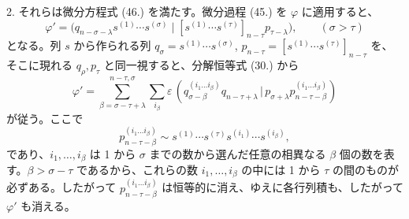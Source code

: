\documentclass[11pt]{jlreq}
\newcommand{\pair}[2]{(#1\,|\,#2)}
\newcommand{\eps}{\varepsilon}
\begin{document}
2. それらは微分方程式 (46.) を満たす。微分過程 (45.) を $\varphi$ に適用すると、
\[
 \varphi'=\bigl(q_{n-\sigma-\lambda}s^{(1)}\cdots s^{(\sigma)}\mid [s^{(1)}\cdots s^{(\tau)}]_{n-\tau}p_{\tau-\lambda}\bigr),\qquad (\sigma>\tau)
\]
となる。列 $s$ から作られる列 $q_\sigma=s^{(1)}\cdots s^{(\sigma)}$, $p_{n-\tau}=[s^{(1)}\cdots s^{(\tau)}]_{n-\tau}$ を、そこに現れる $q_\rho,p_\tau$ と同一視すると、分解恒等式 (30.) から
\[
 \varphi'=\sum_{\beta=\sigma-\tau+\lambda}^{n-\tau,\sigma}\sum_{i_\beta}\eps\,
 \pair{q_{\sigma-\beta}^{(i_1\ldots i_\beta)}q_{n-\tau+\lambda}}{p_{\sigma+\lambda}p_{n-\tau-\beta}^{(i_1\ldots i_\beta)}}
\]
が従う。ここで
\[
 p_{n-\tau-\beta}^{(i_1\ldots i_\beta)}\sim s^{(1)}\cdots s^{(\tau)}s^{(i_1)}\cdots s^{(i_\beta)},
\]
であり、$i_1,\ldots,i_\beta$ は 1 から $\sigma$ までの数から選んだ任意の相異なる $\beta$ 個の数を表す。$\beta>\sigma-\tau$ であるから、これらの数 $i_1,\ldots,i_\beta$ の中には 1 から $\tau$ の間のものが必ずある。したがって $p_{n-\tau-\beta}^{(i_1\ldots i_\beta)}$ は恒等的に消え、ゆえに各行列積も、したがって $\varphi'$ も消える。
\end{document}
